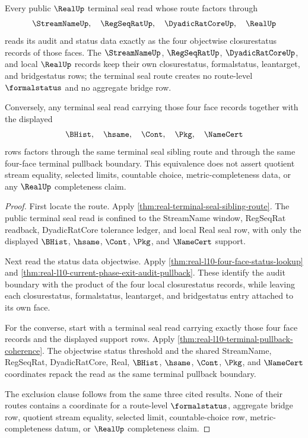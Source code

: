 \begin{theorem}
\label{thm:real-terminal-seal-four-face-status-pullback}
Every public $\RealUp$ terminal seal read whose route factors through
$$
\StreamNameUp,\quad \RegSeqRatUp,\quad \DyadicRatCoreUp,\quad \RealUp
$$
reads its audit and status data exactly as the four objectwise closurestatus
records of those faces. The $\StreamNameUp$, $\RegSeqRatUp$,
$\DyadicRatCoreUp$, and local $\RealUp$ records keep their own closurestatus,
formalstatus, leantarget, and bridgestatus rows; the terminal seal route
creates no route-level $\formalstatus$ and no aggregate bridge row.

Conversely, any terminal seal read carrying those four face records together
with the displayed
$$
\BHist,\quad \hsame,\quad \Cont,\quad \Pkg,\quad \NameCert
$$
rows factors through the same terminal seal sibling route and through the same
four-face terminal pullback boundary. This equivalence does not assert
quotient stream equality, selected limits, countable choice,
metric-completeness data, or any $\RealUp$ completeness claim.
\end{theorem}
\begin{proof}
First locate the route. Apply
\autoref{thm:real-terminal-seal-sibling-route}. The public terminal seal read
is confined to the StreamName window, RegSeqRat readback, DyadicRatCore
tolerance ledger, and local Real seal row, with only the displayed $\BHist$,
$\hsame$, $\Cont$, $\Pkg$, and $\NameCert$ support.

Next read the status data objectwise. Apply
\autoref{thm:real-l10-four-face-status-lookup} and
\autoref{thm:real-l10-current-phase-exit-audit-pullback}. These identify the
audit boundary with the product of the four local closurestatus records, while
leaving each closurestatus, formalstatus, leantarget, and bridgestatus entry
attached to its own face.

For the converse, start with a terminal seal read carrying exactly those four
face records and the displayed support rows. Apply
\autoref{thm:real-l10-terminal-pullback-coherence}. The objectwise status
threshold and the shared StreamName, RegSeqRat, DyadicRatCore, Real,
$\BHist$, $\hsame$, $\Cont$, $\Pkg$, and $\NameCert$ coordinates repack the
read as the same terminal pullback boundary.

The exclusion clause follows from the same three cited results. None of their
routes contains a coordinate for a route-level $\formalstatus$, aggregate
bridge row, quotient stream equality, selected limit, countable-choice row,
metric-completeness datum, or $\RealUp$ completeness claim.
\end{proof}

